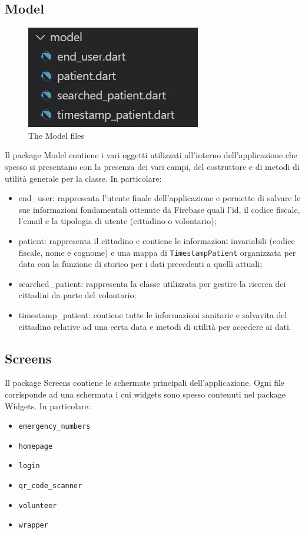\documentclass[12pt,a4paper,twoside,openright,titlepage]{book}
\begin{document}
\subsection{Model}
\begin{figure}[H]
\centering
\includegraphics[scale = 1.0]{model}
\caption{The Model files}
\end{figure}
Il package Model contiene i vari oggetti utilizzati all'interno dell'applicazione che spesso si presentano con la presenza dei vari campi, del costruttore e di metodi di utilità generale per la classe. In particolare:
\begin{itemize}
\item end\_user: rappresenta l'utente finale dell'applicazione e permette di salvare le sue informazioni fondamentali ottenute da Firebase quali l'id, il codice fiscale, l'email e la tipologia di utente (cittadino o volontario);
\item patient: rappresenta il cittadino e contiene le informazioni invariabili (codice fiscale, nome e cognome) e una mappa di \texttt{TimestampPatient} organizzata per data con la funzione di storico per i dati precedenti a quelli attuali;
\item searched\_patient: rappresenta la classe utilizzata per gestire la ricerca dei cittadini da parte del volontario;
\item timestamp\_patient: contiene tutte le informazioni sanitarie e salvavita del cittadino relative ad una certa data e metodi di utilità per accedere ai dati.
\end{itemize}

\subsection{Screens}
Il package Screens contiene le schermate principali dell'applicazione. Ogni file corrisponde ad una schermata i cui widgets sono spesso contenuti nel package Widgets. In particolare:
\begin{itemize}
\item \texttt{emergency\_numbers}
\item \texttt{homepage}
\item \texttt{login}
\item \texttt{qr\_code\_scanner}
\item \texttt{volunteer}
\item \texttt{wrapper}
\end{itemize}
\end{document}
